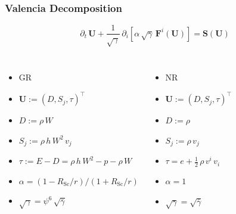 \documentclass{beamer}
\newcommand{\p}{\partial}
\newcommand{\bs}{\boldsymbol}
\newcommand{\rsc}{R_{\mathrm{Sc}}}
\begin{document}
\begin{frame}
\frametitle{Valencia Decomposition}

  \begin{equation*}
    \p_{t}\,\bs{U}
    +\frac{1}{\sqrt{\gamma}}\,
    \p_{i}\left[\alpha\,\sqrt{\gamma}\,\bs{F}^{i}\left(\bs{U}\right)\right]
    =\bs{S}\left(\bs{U}\right)
  \end{equation*}

  \begin{columns}[c]


      \begin{itemize}[<+->]
        \item[]
          GR
        \item[]
          $\bs{U}:=\left(D,S_{j},\tau\right)^{\top}$
        \item[]
          $D:=\rho\,W$
        \item[]
          $S_{j}:=\rho\,h\,W^{2}\,v_{j}$
        \item[]
          $\tau:=E-D=\rho\,h\,W^{2}-p-\rho\,W$
        \item[]
          $\alpha=\left(1-\rsc/r\right)/\left(1+\rsc/r\right)$
        \item[]
          $\sqrt{\gamma}=\psi^{6}\,\sqrt{\bar{\gamma}}$
      \end{itemize}


      \begin{itemize}[<+->]
        \item[]
          NR
        \item[]
          $\bs{U}:=\left(D,S_{j},\tau\right)^{\top}$
        \item[]
          $D:=\rho$
        \item[]
          $S_{j}:=\rho\,v_{j}$
        \item[]
          $\tau=e+\frac{1}{2}\,\rho\,v^{i}\,v_{i}$
        \item[]
          $\alpha=1$
        \item[]
          $\sqrt{\gamma}=\sqrt{\bar{\gamma}}$
      \end{itemize}

  \end{columns}

\end{frame}
\end{document}
